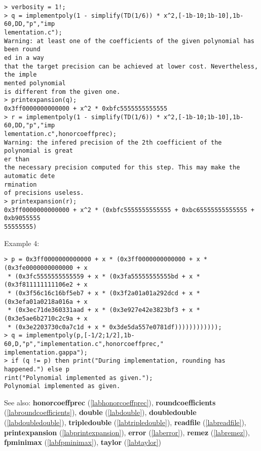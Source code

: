 \begin{center}\begin{minipage}{15cm}\begin{Verbatim}[frame=single]
> verbosity = 1!;
> q = implementpoly(1 - simplify(TD(1/6)) * x^2,[-1b-10;1b-10],1b-60,DD,"p","imp
lementation.c");
Warning: at least one of the coefficients of the given polynomial has been round
ed in a way
that the target precision can be achieved at lower cost. Nevertheless, the imple
mented polynomial
is different from the given one.
> printexpansion(q);
0x3ff0000000000000 + x^2 * 0xbfc5555555555555
> r = implementpoly(1 - simplify(TD(1/6)) * x^2,[-1b-10;1b-10],1b-60,DD,"p","imp
lementation.c",honorcoeffprec);
Warning: the infered precision of the 2th coefficient of the polynomial is great
er than
the necessary precision computed for this step. This may make the automatic dete
rmination
of precisions useless.
> printexpansion(r);
0x3ff0000000000000 + x^2 * (0xbfc5555555555555 + 0xbc65555555555555 + 0xb9055555
55555555)
\end{Verbatim}
\end{minipage}\end{center}
\noindent Example 4: 
\begin{center}\begin{minipage}{15cm}\begin{Verbatim}[frame=single]
> p = 0x3ff0000000000000 + x * (0x3ff0000000000000 + x * (0x3fe0000000000000 + x
 * (0x3fc5555555555559 + x * (0x3fa55555555555bd + x * (0x3f811111111106e2 + x
 * (0x3f56c16c16bf5eb7 + x * (0x3f2a01a01a292dcd + x * (0x3efa01a0218a016a + x
 * (0x3ec71de360331aad + x * (0x3e927e42e3823bf3 + x * (0x3e5ae6b2710c2c9a + x
 * (0x3e2203730c0a7c1d + x * 0x3de5da557e0781df))))))))))));
> q = implementpoly(p,[-1/2;1/2],1b-60,D,"p","implementation.c",honorcoeffprec,"
implementation.gappa");
> if (q != p) then print("During implementation, rounding has happened.") else p
rint("Polynomial implemented as given.");    
Polynomial implemented as given.
\end{Verbatim}
\end{minipage}\end{center}
See also: \textbf{honorcoeffprec} (\ref{labhonorcoeffprec}), \textbf{roundcoefficients} (\ref{labroundcoefficients}), \textbf{double} (\ref{labdouble}), \textbf{doubledouble} (\ref{labdoubledouble}), \textbf{tripledouble} (\ref{labtripledouble}), \textbf{readfile} (\ref{labreadfile}), \textbf{printexpansion} (\ref{labprintexpansion}), \textbf{error} (\ref{laberror}), \textbf{remez} (\ref{labremez}), \textbf{fpminimax} (\ref{labfpminimax}), \textbf{taylor} (\ref{labtaylor})
